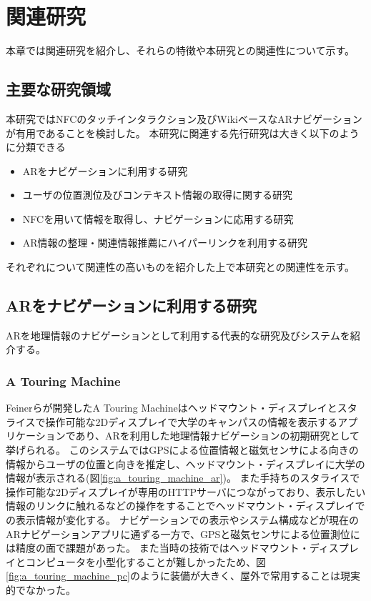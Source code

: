\chapter{関連研究}
\label{chap:relatedResearch}

本章では関連研究を紹介し、それらの特徴や本研究との関連性について示す。

\newpage


\section{主要な研究領域}
本研究ではNFCのタッチインタラクション及びWikiベースなARナビゲーションが有用であることを検討した。
本研究に関連する先行研究は大きく以下のように分類できる
\begin{itemize}
  \item ARをナビゲーションに利用する研究
  \item ユーザの位置測位及びコンテキスト情報の取得に関する研究
  \item NFCを用いて情報を取得し、ナビゲーションに応用する研究
  \item AR情報の整理・関連情報推薦にハイパーリンクを利用する研究
\end{itemize}
それぞれについて関連性の高いものを紹介した上で本研究との関連性を示す。

\section{ARをナビゲーションに利用する研究}
ARを地理情報のナビゲーションとして利用する代表的な研究及びシステムを紹介する。

\subsection{A Touring Machine}
Feinerらが開発したA Touring Machine\cite{629922}はヘッドマウント・ディスプレイとスタライスで操作可能な2Dディスプレイで大学のキャンパスの情報を表示するアプリケーションであり、ARを利用した地理情報ナビゲーションの初期研究として挙げられる。
このシステムではGPSによる位置情報と磁気センサによる向きの情報からユーザの位置と向きを推定し、ヘッドマウント・ディスプレイに大学の情報が表示される(図\ref{fig:a_touring_machine_ar})。
また手持ちのスタライスで操作可能な2Dディスプレイが専用のHTTPサーバにつながっており、表示したい情報のリンクに触れるなどの操作をすることでヘッドマウント・ディスプレイでの表示情報が変化する。
ナビゲーションでの表示やシステム構成などが現在のARナビゲーションアプリに通ずる一方で、GPSと磁気センサによる位置測位には精度の面で課題があった。
また当時の技術ではヘッドマウント・ディスプレイとコンピュータを小型化することが難しかったため、図\ref{fig:a_touring_machine_pc}のように装備が大きく、屋外で常用することは現実的でなかった。


